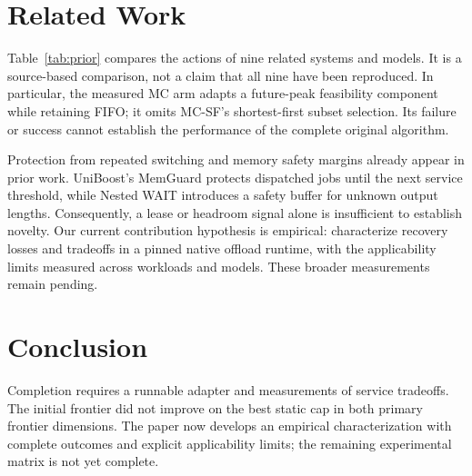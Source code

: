 \documentclass[11pt]{article}
\begin{document}
\section{Related Work}
Table~\ref{tab:prior} compares the actions of nine related systems and
models. It is a source-based comparison, not a claim that all nine have
been reproduced. In particular, the measured MC arm adapts a future-peak
feasibility component while retaining FIFO; it omits MC-SF's shortest-first
subset selection. Its failure or success cannot establish the performance
of the complete original algorithm.

Protection from repeated switching and memory safety margins already
appear in prior work. UniBoost's MemGuard protects dispatched jobs until
the next service threshold, while Nested WAIT introduces a safety buffer
for unknown output lengths. Consequently, a lease or headroom signal
alone is insufficient to establish novelty. Our current contribution
hypothesis is empirical: characterize recovery losses and tradeoffs in a
pinned native offload runtime, with the applicability limits measured
across workloads and models. These broader measurements remain pending.
{}
{}
\section{Conclusion}
Completion requires a runnable adapter and measurements of service
tradeoffs. The initial frontier did not improve on the best static cap in both
primary frontier dimensions. The paper now develops an empirical
characterization with complete outcomes and explicit applicability limits;
the remaining experimental matrix is not yet complete.
\end{document}
